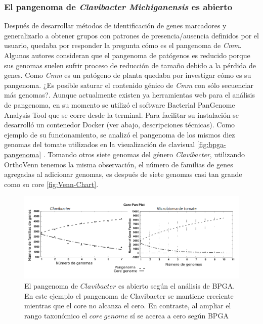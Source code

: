 \documentclass[12pt,twoside]{reedthesis}
\begin{document}
  \subsubsection{\texorpdfstring{El pangenoma de \emph{Clavibacter
  Michiganensis} es
  abierto}{El pangenoma de Clavibacter Michiganensis es abierto}}\label{el-pangenoma-de-clavibacter-michiganensis-es-abierto}
  
  Después de desarrollar métodos de identificación de genes marcadores y
  generalizarlo a obtener grupos con patrones de presencia/ausencia
  definidos por el usuario, quedaba por responder la pregunta cómo es el
  pangenoma de \emph{Cmm}. Algunos autores consideran que el pangenoma de
  patógenos es reducido porque sus genomas suelen sufrir proceso de
  reducción de tamaño debido a la pérdida de genes. Como \emph{Cmm} es un
  patógeno de planta quedaba por investigar cómo es su pangenoma. ¿Es
  posible saturar el contenido génico de \emph{Cmm} con sólo secuenciar
  más genomas?. Aunque actualmente existen ya herramientas web para el
  análisis de pangenoma, en su momento se utilizó el software Bacterial
  PanGenome Analysis Tool que se corre desde la terminal. Para facilitar
  su instalación se desarrolló un contenedor Docker (ver abajo,
  descripciones técnicas). Como ejemplo de su funcionamiento, se analizó
  el pangenoma de los mismos diez genomas del tomate utilizados en la
  visualización de clavisual \autoref{fig:bpga-pangenoma} . Tomando otros
  siete genomas del género \emph{Clavibacter}, utilizando OrthoVenn
  tenemos la misma observación, el número de familias de genes agregadas
  al adicionar genomas, es después de siete genomas casi tan grande como
  su core \autoref{fig:Venn-Chart}.
  
  \begin{figure}[h!tbp]
  \centering
  \includegraphics[angle = 0,scale = .5]{chapter1/bpga-pangenoma.png}
  \caption[El pangenoma de $Clavibacter$ es abierto según el análisis de BPGA.]{\footnotesize{El pangenoma de $Clavibacter$ es abierto según el análisis de BPGA. En este ejemplo el pangenoma de Clavibacter se mantiene creciente mientras que el core no alcanza el cero. En contraste, al ampliar el rango taxonómico el $core~genome$ sí se acerca a cero según BPGA}}
  \label{fig:bpga-pangenoma}
  \end{figure}
  
\end{document}
